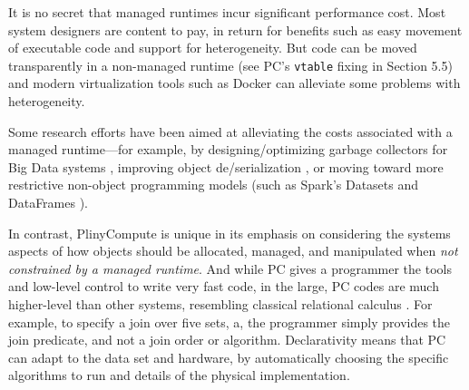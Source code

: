 It is no secret that managed runtimes incur significant performance cost.  Most system designers are content to pay, in return for benefits such as easy movement of executable code and support for heterogeneity.  But code can be moved transparently
in a non-managed runtime (see PC's \texttt{vtable} fixing in Section 5.5) and modern virtualization tools such as Docker \cite{merkel2014docker} 
can alleviate some problems with heterogeneity.    

Some research efforts 
have been aimed at alleviating the costs associated with a managed runtime---for example, by designing/optimizing
garbage collectors for Big Data systems \cite{nguyen2016yak, bruno2017ng2c, maas2015trash, gog2015broom}, improving
object 
de/serialization \cite{horvath2017code, miller2013instant}, or moving toward more restrictive non-object programming models (such as 
Spark's Datasets \cite{datasets} and DataFrames \cite{armbrust2015spark}).

In contrast, PlinyCompute is unique in its emphasis on considering the systems aspects of
how objects should be allocated, managed, and manipulated when \emph{not constrained by a managed runtime}.
And while PC gives a programmer the tools and low-level control to write very fast code,
in the large, PC codes are much higher-level than other systems, resembling classical relational
calculus \cite{codd1971data}.  For example, to specify a join over five sets, 
a, the programmer simply provides the join predicate, and not a join order or algorithm.
Declarativity means that PC can adapt to the data set and hardware, by automatically choosing the
specific algorithms to run and details of the physical implementation.



